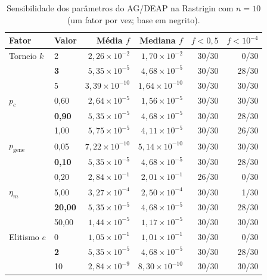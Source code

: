 \begin{table}[!t]
\centering
\footnotesize
\setlength{\tabcolsep}{3pt}
\caption{Sensibilidade dos parâmetros do AG/DEAP na Rastrigin com $n=10$ (um fator por vez; base em negrito).}
\label{tab:a2_sens}
\begin{tabular}{@{}llrrrr@{}}
\toprule
Fator & Valor & Média $f$ & Mediana $f$ & $f<0{,}5$ & $f<10^{-4}$ \\
\midrule
Torneio $k$ & 2 & $2{,}26\times10^{-2}$ & $1{,}70\times10^{-2}$ & 30/30 & 0/30 \\
 & \textbf{3} & $5{,}35\times10^{-5}$ & $4{,}68\times10^{-5}$ & 30/30 & 28/30 \\
 & 5 & $3{,}39\times10^{-10}$ & $1{,}64\times10^{-10}$ & 30/30 & 30/30 \\
\midrule
$p_c$ & 0{,}60 & $2{,}64\times10^{-5}$ & $1{,}56\times10^{-5}$ & 30/30 & 30/30 \\
 & \textbf{0{,}90} & $5{,}35\times10^{-5}$ & $4{,}68\times10^{-5}$ & 30/30 & 28/30 \\
 & 1{,}00 & $5{,}75\times10^{-5}$ & $4{,}11\times10^{-5}$ & 30/30 & 26/30 \\
\midrule
$p_{\mathrm{gene}}$ & 0{,}05 & $7{,}22\times10^{-10}$ & $5{,}14\times10^{-10}$ & 30/30 & 30/30 \\
 & \textbf{0{,}10} & $5{,}35\times10^{-5}$ & $4{,}68\times10^{-5}$ & 30/30 & 28/30 \\
 & 0{,}20 & $2{,}84\times10^{-1}$ & $2{,}01\times10^{-1}$ & 26/30 & 0/30 \\
\midrule
$\eta_m$ & 5{,}00 & $3{,}27\times10^{-4}$ & $2{,}50\times10^{-4}$ & 30/30 & 1/30 \\
 & \textbf{20{,}00} & $5{,}35\times10^{-5}$ & $4{,}68\times10^{-5}$ & 30/30 & 28/30 \\
 & 50{,}00 & $1{,}44\times10^{-5}$ & $1{,}17\times10^{-5}$ & 30/30 & 30/30 \\
\midrule
Elitismo $e$ & 0 & $1{,}05\times10^{-1}$ & $1{,}01\times10^{-1}$ & 30/30 & 0/30 \\
 & \textbf{2} & $5{,}35\times10^{-5}$ & $4{,}68\times10^{-5}$ & 30/30 & 28/30 \\
 & 10 & $2{,}84\times10^{-9}$ & $8{,}30\times10^{-10}$ & 30/30 & 30/30 \\
\bottomrule
\end{tabular}
\end{table}
